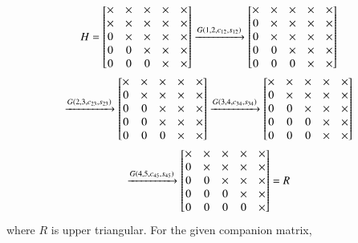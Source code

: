\documentclass[journal]{IEEEtran}
\begin{document}
\begin{multline}
	H = \begin{bmatrix}
		\times & \times & \times & \times & \times\\
		\times & \times & \times & \times & \times\\
		0 & \times & \times & \times & \times\\
		0 & 0 & \times & \times & \times\\
		0 & 0 & 0 & \times & \times
	\end{bmatrix} \xrightarrow{G\left(1, 2, c_{12}, s_{12}\right)}
	\begin{bmatrix}
		\times & \times & \times & \times & \times\\
		0 & \times & \times & \times & \times\\
		0 & \times & \times & \times & \times\\
		0 & 0 & \times & \times & \times\\
		0 & 0 & 0 & \times & \times
	\end{bmatrix} \\\xrightarrow{G\left(2, 3, c_{23}, s_{23}\right)}
	\begin{bmatrix}
		\times & \times & \times & \times & \times\\
		0 & \times & \times & \times & \times\\
		0 & 0 & \times & \times & \times\\
		0 & 0 & \times & \times & \times\\
		0 & 0 & 0 & \times & \times
	\end{bmatrix} \xrightarrow{G\left(3, 4, c_{34}, s_{34}\right)}
	\begin{bmatrix}
		\times & \times & \times & \times & \times\\
		0 & \times & \times & \times & \times\\
		0 & 0 & \times & \times & \times\\
		0 & 0 & 0 & \times & \times\\
		0 & 0 & 0 & \times & \times
	\end{bmatrix} \\\xrightarrow{G\left(4, 5, c_{45}, s_{45}\right)}
	\begin{bmatrix}
		\times & \times & \times & \times & \times\\
		0 & \times & \times & \times & \times\\
		0 & 0 & \times & \times & \times\\
		0 & 0 & 0 & \times & \times\\
		0 & 0 & 0 & 0 & \times
	\end{bmatrix} = R
\end{multline}
where $R$ is upper triangular.
For the given companion matrix,
\end{document}
